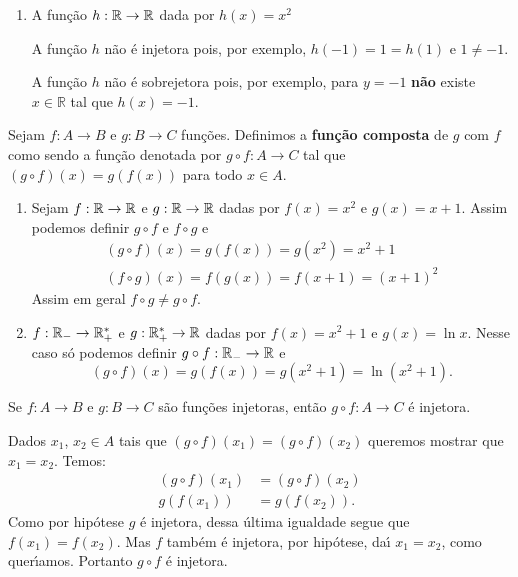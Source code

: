 \begin{exemplos}
\begin{enumerate}[label={\arabic*})]
		\item A fun\c{c}\~ao $h :\mathbb{R} \to \mathbb{R}$ dada por $h(x) = x^2$
		\begin{solucao}
			A fun\c{c}\~ao $h$ n\~ao \'e injetora pois, por exemplo, $h(-1) = 1 = h(1)$ e $1\neq -1$.

			A fun\c{c}\~ao $h$ n\~ao \'e sobrejetora pois, por exemplo, para $y = -1$ \textbf{n\~ao} existe $x\in\mathbb{R}$ tal que $h(x) = -1$.
		\end{solucao}
		\end{enumerate}
\end{exemplos}

\begin{definicao}
	Sejam $f : A \to B$ e $g : B \to C$ fun\c{c}\~oes. Definimos a \textbf{fun\c{c}\~ao composta} de $g$ com $f$ como sendo a fun\c{c}\~ao denotada por $g \circ f : A \to C$ tal que $(g\circ f)(x) = g(f(x))$ para todo $x \in A$.
\end{definicao}

\begin{exemplos}
	\begin{enumerate}[label={\arabic*})]
		\item Sejam $f : \mathbb{R} \to \mathbb{R}$ e $g : \mathbb{R} \to \mathbb{R}$ dadas por $f(x) = x^2$ e $g(x) = x + 1$. Assim podemos definir $g \circ f$ e $f \circ g$ e
		\begin{align*}
			(g\circ f)(x) = g(f(x)) = g(x^2) = x^2 + 1\\
			(f\circ g)(x) = f(g(x)) = f(x + 1) = (x + 1)^2
		\end{align*}
		Assim em geral $f \circ g \ne g \circ f$.

		\item $f : \mathbb{R}_- \to \mathbb{R}^*_+$ e $g : \mathbb{R}^*_+ \to \mathbb{R}$ dadas por $f(x) = x^2 + 1$ e $g(x) = \ln x$. Nesse caso s\'o podemos definir $g \circ f : \mathbb{R}_- \to \mathbb{R}$ e
		\[
			(g\circ f)(x) = g(f(x)) = g(x^2 + 1) = \ln(x^2 + 1).
		\]
	\end{enumerate}
\end{exemplos}

\begin{proposicao}
	Se $f : A \to B$ e $g : B \to C$ s{\~a}o fun{\c c}{\~o}es injetoras, ent{\~a}o $g\circ f : A \to C$ {\'e} injetora.
\end{proposicao}
\begin{prova}
	Dados $x_1$, $x_2 \in A$ tais que $(g\circ f)(x_1) = (g\circ f)(x_2)$ queremos mostrar que $x_1 = x_2$. Temos:
	\begin{align*}
		(g\circ f)(x_1) &= (g\circ f)(x_2)\\
		g(f(x_1)) &= g(f(x_2)).
	\end{align*}
	Como por hip\'otese $g$ \'e injetora, dessa \'ultima igualdade segue que $f(x_1) = f(x_2)$. Mas $f$ tamb\'em \'e injetora, por hip\'otese, da{\'\i} $x_1 = x_2$, como quer{\'\i}amos. Portanto $g\circ f$ \'e injetora.
\end{prova}

